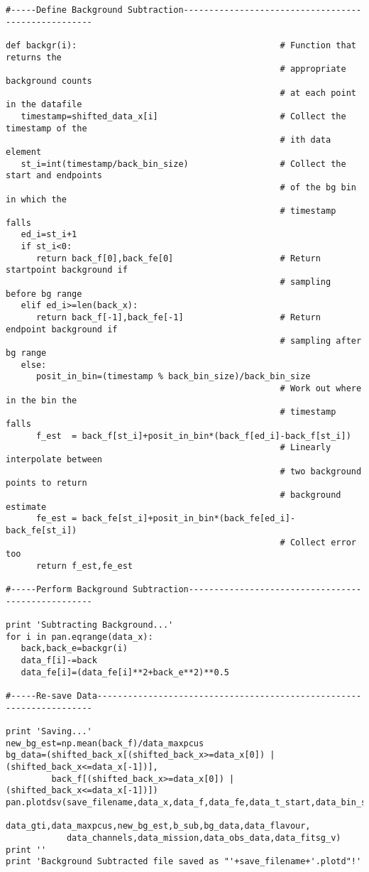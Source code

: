 \begin{verbatim}
#-----Define Background Subtraction----------------------------------------------------

def backgr(i):                                        # Function that returns the
                                                      # appropriate background counts
                                                      # at each point in the datafile
   timestamp=shifted_data_x[i]                        # Collect the timestamp of the
                                                      # ith data element
   st_i=int(timestamp/back_bin_size)                  # Collect the start and endpoints
                                                      # of the bg bin in which the
                                                      # timestamp falls
   ed_i=st_i+1
   if st_i<0:
      return back_f[0],back_fe[0]                     # Return startpoint background if
                                                      # sampling before bg range
   elif ed_i>=len(back_x):
      return back_f[-1],back_fe[-1]                   # Return endpoint background if
                                                      # sampling after bg range
   else:
      posit_in_bin=(timestamp % back_bin_size)/back_bin_size
                                                      # Work out where in the bin the
                                                      # timestamp falls
      f_est  = back_f[st_i]+posit_in_bin*(back_f[ed_i]-back_f[st_i])
                                                      # Linearly interpolate between
                                                      # two background points to return
                                                      # background estimate
      fe_est = back_fe[st_i]+posit_in_bin*(back_fe[ed_i]-back_fe[st_i])
                                                      # Collect error too
      return f_est,fe_est

#-----Perform Background Subtraction---------------------------------------------------

print 'Subtracting Background...'
for i in pan.eqrange(data_x):
   back,back_e=backgr(i)
   data_f[i]-=back
   data_fe[i]=(data_fe[i]**2+back_e**2)**0.5

#-----Re-save Data---------------------------------------------------------------------

print 'Saving...'
new_bg_est=np.mean(back_f)/data_maxpcus
bg_data=(shifted_back_x[(shifted_back_x>=data_x[0]) | (shifted_back_x<=data_x[-1])],
         back_f[(shifted_back_x>=data_x[0]) | (shifted_back_x<=data_x[-1])])
pan.plotdsv(save_filename,data_x,data_f,data_fe,data_t_start,data_bin_size,
            data_gti,data_maxpcus,new_bg_est,b_sub,bg_data,data_flavour,
            data_channels,data_mission,data_obs_data,data_fitsg_v)
print ''
print 'Background Subtracted file saved as "'+save_filename+'.plotd"!'

\end{verbatim}

